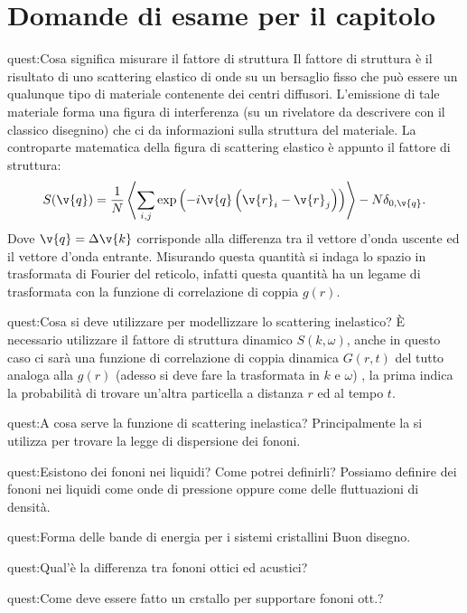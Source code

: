 \clearpage 
\section*{Domande di esame per il capitolo}%
\begin{quest}{quest:Cosa significa misurare il fattore di struttura}
    Il fattore di struttura è il risultato di uno scattering elastico di onde su un bersaglio fisso che può essere un qualunque tipo di materiale contenente dei centri diffusori. L'emissione di tale materiale forma una figura di interferenza (su un rivelatore da descrivere con il classico disegnino) che ci da informazioni sulla struttura del materiale. 
    La controparte matematica della figura di scattering elastico è appunto il fattore di struttura:
    \[
	S(\v{q}) = \frac{1}{N}\left<\sum_{i,j}^{} \exp\left(-i\v{q}\left(\v{r}_i-\v{r}_j\right)\right)\right> - N\delta_{0,\v{q}}
    .\] 
    Dove $\v{q}=\Delta\v{k}$ corrisponde alla differenza tra il vettore d'onda uscente ed il vettore d'onda entrante.
    Misurando questa quantità si indaga lo spazio in trasformata di Fourier del reticolo, infatti questa quantità ha un legame di trasformata con la funzione di correlazione di coppia $g(r)$.
\end{quest}
\begin{quest}{quest:Cosa si deve utilizzare per modellizzare lo scattering inelastico?}
    È necessario utilizzare il fattore di struttura dinamico $S(k,\omega)$, anche in questo caso ci sarà una funzione di correlazione di coppia dinamica $G(r,t)$ del tutto analoga alla $g(r)$ (adesso si deve fare la trasformata in $k$ e $\omega$) , la prima indica la probabilità di trovare un'altra particella a distanza $r$ ed al tempo $t$.
\end{quest}
\begin{quest}{quest:A cosa serve la funzione di scattering inelastica?}
Principalmente la si utilizza per trovare la legge di dispersione dei fononi.
\end{quest}
\begin{quest}{quest:Esistono dei fononi nei liquidi? Come potrei definirli?}
Possiamo definire dei fononi nei liquidi come onde di pressione oppure come delle fluttuazioni di densità.
\end{quest}
\begin{quest}{quest:Forma delle bande di energia per i sistemi cristallini}
Buon disegno.
\end{quest}
\begin{quest}{quest:Qual'è la differenza tra fononi ottici ed acustici?}
\end{quest}
\begin{quest}{quest:Come deve essere fatto un crstallo per supportare fononi ott.?}
\end{quest}


